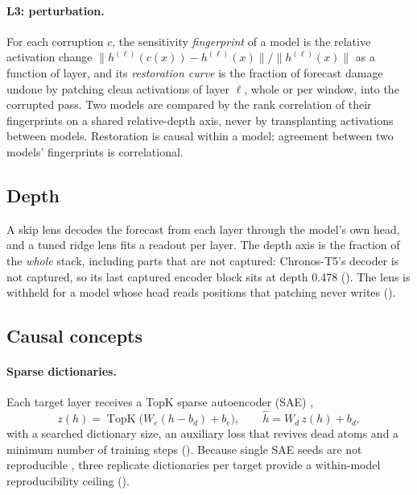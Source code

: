 \paragraph{L3: perturbation.} For each corruption $c$, the sensitivity \emph{fingerprint} of a model is the relative
activation change $\|h^{(\ell)}(c(x))-h^{(\ell)}(x)\|/\|h^{(\ell)}(x)\|$ as a function of layer, and its
\emph{restoration curve} is the fraction of forecast damage undone by patching clean activations of layer $\ell$, whole
or per window, into the corrupted pass. Two models are compared by the rank correlation of their fingerprints on a
shared relative-depth axis, never by transplanting activations between models. Restoration is causal within a model;
agreement between two models' fingerprints is correlational.

\subsection{Depth}
\label{sec:depth}

A skip lens decodes the forecast from each layer through the model's own head, and a tuned ridge lens
\citep{belrose2023tuned} fits a readout per layer. The depth axis is the fraction of the \emph{whole} stack, including
parts that are not captured: Chronos-T5's decoder is not captured, so its last captured encoder block sits at depth
0.478 (). The lens is withheld for a model whose head reads positions that patching never writes ().

\subsection{Causal concepts}
\label{sec:concepts}

\paragraph{Sparse dictionaries.} Each target layer receives a TopK sparse autoencoder (SAE)
\citep{makhzani2013ksparse,gao2025topk},
\begin{equation}
  z(h)=\operatorname{TopK}\big(W_e(h-b_d)+b_e\big), \qquad \hat h=W_d\, z(h)+b_d ,
\end{equation}
with a searched dictionary size, an auxiliary loss that revives dead atoms and a minimum number of training steps
(). Because single SAE seeds are not reproducible \citep{paulo2025seeds}, three replicate dictionaries per
target provide a within-model reproducibility ceiling ().

